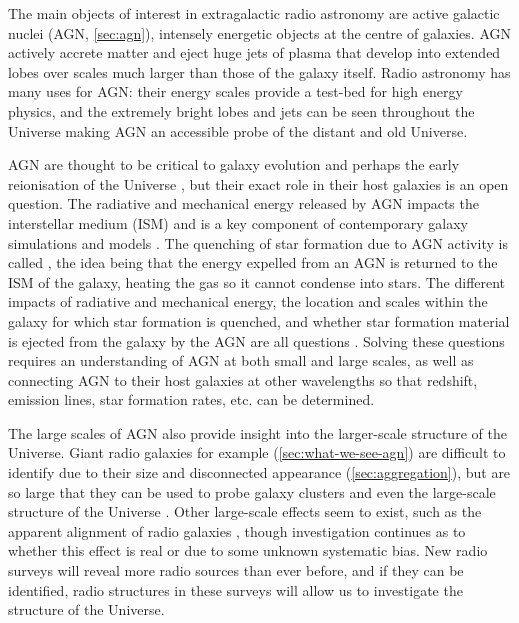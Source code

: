     The main objects of interest in extragalactic radio astronomy are active galactic nuclei (AGN, \autoref{sec:agn}), intensely energetic objects at the centre of galaxies. AGN actively accrete matter and eject huge jets of plasma that develop into extended lobes over scales much larger than those of the galaxy itself. Radio astronomy has many uses for AGN: their energy scales provide a test-bed for high energy physics, and the extremely bright lobes and jets can be seen throughout the Universe making AGN an accessible probe of the distant and old Universe.

    AGN are thought to be critical to galaxy evolution and perhaps the early reionisation of the Universe \citep{bosch-ramon_role_2018}, but their exact role in their host galaxies is an open question. The radiative and mechanical energy released by AGN impacts the interstellar medium (ISM) and is a key component of contemporary galaxy simulations and models \citep{morganti_many_2017}. The quenching of star formation due to AGN activity is called , the idea being that the energy expelled from an AGN is returned to the ISM of the galaxy, heating the gas so it cannot condense into stars. The different impacts of radiative and mechanical energy, the location and scales within the galaxy for which star formation is quenched, and whether star formation material is ejected from the galaxy by the AGN are all questions \citep{husemann_reality_2018}. Solving these questions requires an understanding of AGN at both small and large scales, as well as connecting AGN to their host galaxies at other wavelengths so that redshift, emission lines, star formation rates, etc. can be determined.

    The large scales of AGN also provide insight into the larger-scale structure of the Universe. Giant radio galaxies for example (\autoref{sec:what-we-see-agn}) are difficult to identify due to their size and disconnected appearance (\autoref{sec:aggregation}), but are so large that they can be used to probe galaxy clusters \citep{banfield_radio_2016} and even the large-scale structure of the Universe \citep{reiprich_abell_2020}. Other large-scale effects seem to exist, such as the apparent alignment of radio galaxies \citep{contigiani_radio_2017,panwar_alignment_2020}, though investigation continues as to whether this effect is real or due to some unknown systematic bias. New radio surveys will reveal more radio sources than ever before, and if they can be identified, radio structures in these surveys will allow us to investigate the structure of the Universe.

